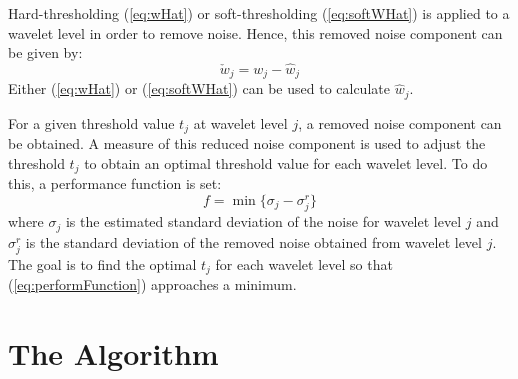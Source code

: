 \documentclass[twocolumn]{article}
\begin{document}
Hard-thresholding (\ref{eq:wHat}) or soft-thresholding (\ref{eq:softWHat}) is applied to a wavelet 
level in order to remove noise. 
Hence, this removed noise component can be given by: 
\begin{equation}
	\check{w}_{j} = w_{j} - \hat{w}_{j}
        \label{eq:wCheck}
\end{equation}
Either (\ref{eq:wHat}) or (\ref{eq:softWHat}) can be used to calculate $\hat{w}_{j}$.

For a given threshold value $t_{j}$ at wavelet level $j$, a removed noise component can be obtained. A
measure of this reduced noise component is used to adjust the threshold $t_{j}$ to obtain an optimal 
threshold value for each wavelet level. To do this, a performance function is set:
\begin{equation}
        f = \min \{ \sigma_{j} - \sigma_{j}^{r} \}
        \label{eq:performFunction}
\end{equation}
where $\sigma_{j}$ is the estimated standard deviation of the noise for wavelet level $j$
and $\sigma_{j}^{r}$ is the standard deviation of the removed noise obtained from wavelet level $j$.
The goal is to find the optimal $t_{j}$ for each wavelet level so that (\ref{eq:performFunction})
approaches a minimum.

\section{The Algorithm}
\end{document}
